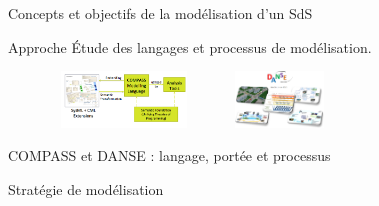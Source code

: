 \begin{frame}{Concepts et objectifs de la modélisation d'un SdS}
\begin{block}{Approche}
\centering
Étude des langages et processus de modélisation.
\begin{figure} 
\includegraphics[width=4cm, height=1.5cm]{imgs/compass.png}
\hspace{0.5cm}
\includegraphics[width=4cm, height=1.5cm]{imgs/danse.png}
\end{figure}
\end{block} 

\end{frame}

\begin{frame}{COMPASS et DANSE : langage, portée et processus}
\end{frame}


\begin{frame}{Stratégie de modélisation}
\end{frame}

